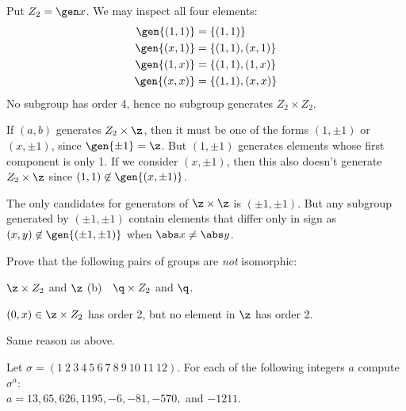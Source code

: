\begin{solalph}
    \item Put $Z_2 = \gen x$. We may inspect all four elements:
    \begin{align*}
        \gen{(1, 1)} & = \{(1, 1)\} \\
        \gen{(x, 1)} & = \{(1, 1), (x, 1)\} \\
        \gen{(1, x)} & = \{(1, 1), (1, x)\} \\
        \gen{(x, x)} & = \{(1, 1), (x, x)\}
    \end{align*}
    No subgroup has order 4, hence no subgroup generates $Z_2 \times Z_2$.
    \item If $(a, b)$ generates $Z_2 \times \z$, then it must be one of the forms $(1, \pm 1)$ or $(x, \pm 1)$, since $\gen{\pm 1} = \z$. But $(1, \pm 1)$ generates elements whose first component is only 1. If we consider $(x, \pm 1)$, then this also doesn't generate $Z_2 \times \z$ since $(1, 1) \not\in \gen{(x, \pm 1)}$.
    \item The only candidates for generators of $\z \times \z$ is $(\pm 1, \pm 1)$. But any subgroup generated by $(\pm 1, \pm 1)$ contain elements that differ only in sign as $(x, y) \not\in \gen{(\pm 1, \pm 1)}$ when $\abs x \neq \abs y$.
\end{solalph}

\begin{exercise}\label{ex2.3.13}
    Prove that the following pairs of groups are \emph{not} isomorphic:
    \begin{subproblems}
        \item $\z \times Z_2$ and $\z$ \quad (b)~~$\q \times Z_2$ and $\q$.
    \end{subproblems}
\end{exercise}

\begin{solalph}
    \item $(0, x) \in \z \times Z_2$ has order 2, but no element in $\z$ has order 2.
    \item Same reason as above. 
\end{solalph}

\begin{exercise}\label{ex2.3.14}
    Let $\sigma = (1\ 2\ 3\ 4\ 5\ 6\ 7\ 8\ 9\ 10\ 11\ 12)$. For each of the following integers $a$ compute $\sigma^a$: 
    \\ $a = 13, 65, 626, 1195, -6, -81, -570,$ and $-1211$.
\end{exercise}


